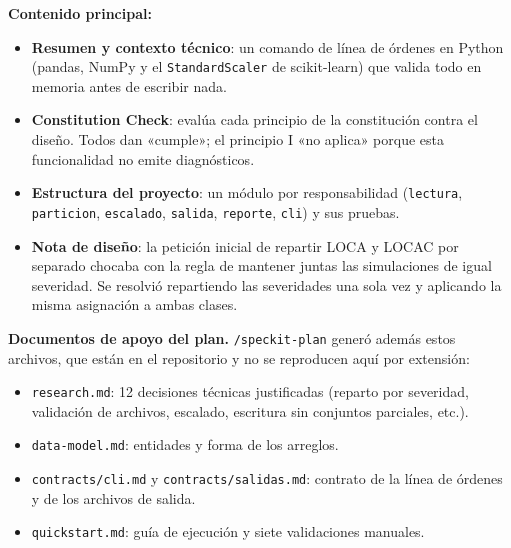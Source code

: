 \documentclass[12pt,a4paper]{article}
\begin{document}
\textbf{Contenido principal:}
\begin{itemize}
  \item \textbf{Resumen y contexto técnico}: un comando de línea de órdenes en Python (pandas, NumPy y el \texttt{StandardScaler} de scikit-learn) que valida todo en memoria antes de escribir nada.
  \item \textbf{Constitution Check}: evalúa cada principio de la constitución contra el diseño. Todos dan «cumple»; el principio I «no aplica» porque esta funcionalidad no emite diagnósticos.
  \item \textbf{Estructura del proyecto}: un módulo por responsabilidad (\texttt{lectura}, \texttt{particion}, \texttt{escalado}, \texttt{salida}, \texttt{reporte}, \texttt{cli}) y sus pruebas.
  \item \textbf{Nota de diseño}: la petición inicial de repartir LOCA y LOCAC por separado chocaba con la regla de mantener juntas las simulaciones de igual severidad. Se resolvió repartiendo las severidades una sola vez y aplicando la misma asignación a ambas clases.
\end{itemize}

\textbf{Documentos de apoyo del plan.} \texttt{/speckit-plan} generó además estos archivos, que están en el repositorio y no se reproducen aquí por extensión:
\begin{itemize}
  \item \texttt{research.md}: 12 decisiones técnicas justificadas (reparto por severidad, validación de archivos, escalado, escritura sin conjuntos parciales, etc.).
  \item \texttt{data-model.md}: entidades y forma de los arreglos.
  \item \texttt{contracts/cli.md} y \texttt{contracts/salidas.md}: contrato de la línea de órdenes y de los archivos de salida.
  \item \texttt{quickstart.md}: guía de ejecución y siete validaciones manuales.
\end{itemize}
\end{document}
